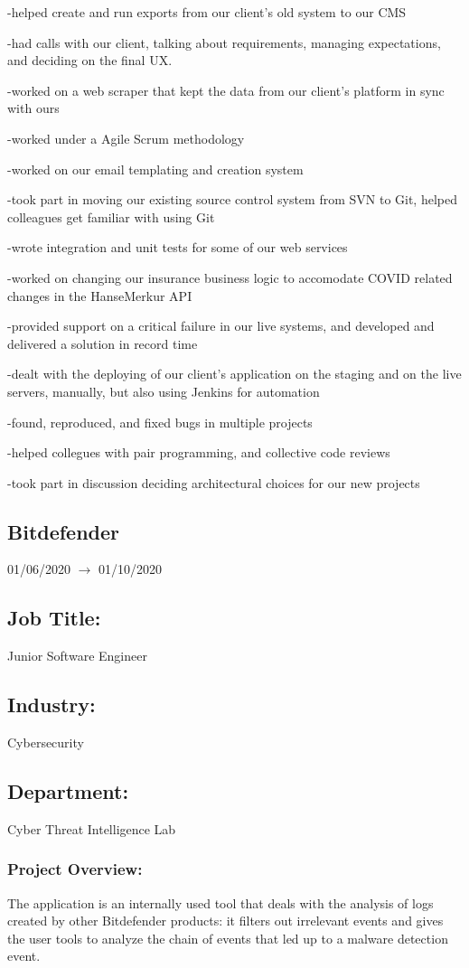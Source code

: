 \documentclass[a4paper,hidelinks,11pt]{article}
\begin{document}
-helped create and run exports from our client's old system to our CMS

-had calls with our client, talking about requirements, managing expectations, and deciding on the final UX.

-worked on a web scraper that kept the data from our client's platform in sync with ours

-worked under a Agile Scrum methodology

-worked on our email templating and creation system

-took part in moving our existing source control system from SVN to Git, helped colleagues get familiar with using Git

-wrote integration and unit tests for some of our web services

-worked on changing our insurance business logic to accomodate COVID related changes in the HanseMerkur API

-provided support on a critical failure in our live systems, and developed and delivered a solution in record time

-dealt with the deploying of our client's application on the staging and on the live servers, manually, but also using Jenkins for automation

-found, reproduced, and fixed bugs in multiple projects

-helped collegues with pair programming, and collective code reviews

-took part in discussion deciding architectural choices for our new projects




\subsection{Bitdefender} 01/06/2020 $\rightarrow$ 01/10/2020
\subsection{Job Title:} Junior Software Engineer
\subsection{Industry:} Cybersecurity
\subsection{Department:} Cyber Threat Intelligence Lab
\subsubsection{Project Overview:}
The application is an internally used tool that deals with the analysis of logs created by other Bitdefender products: it filters out irrelevant events and gives the user tools to analyze the chain of events that led up to a malware detection event.
\end{document}
